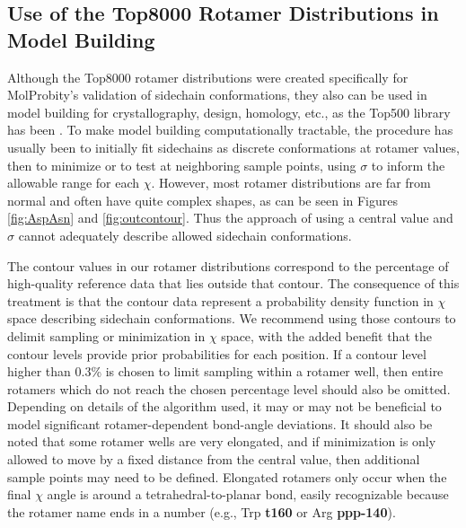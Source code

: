 \subsection{Use of the Top8000 Rotamer Distributions in Model Building}
Although the Top8000 rotamer distributions were created specifically for MolProbity's validation of sidechain conformations, they also can be used in model building for crystallography, design, homology, etc., as the Top500 library has been \cite{Arendall2005, Langer2008, Emsley:ba5144, Headd2008, Terwilliger2008, Adams:2010fk, Gainza2013,Porebski2016}. To make model building computationally tractable, \textcolor{changecolor}{the procedure has usually been to} initially fit sidechains as discrete conformations at rotamer values, then to minimize or to test at neighboring sample points, using $\sigma$ to inform the allowable range for each $\chi$. However, most rotamer distributions are far from normal and often have quite complex shapes, as can be seen in Figures \ref{fig:AspAsn} and \ref{fig:outcontour}. Thus the approach of using a central value and $\sigma$ cannot adequately describe allowed sidechain conformations. 

The contour values in our rotamer distributions correspond to the percentage of high-quality reference data that lies outside that contour. The consequence of this treatment is that the contour data represent a probability density function in $\chi$ space describing sidechain conformations. We recommend using those contours to delimit sampling or minimization in $\chi$ space, with the added benefit that the contour levels provide prior probabilities for each position. If a contour level higher than 0.3\% is chosen \textcolor{changecolor}{to limit sampling within a rotamer well}, then entire rotamers which do not reach the chosen percentage level should also be omitted. Depending on details of the algorithm used, it may or may not be beneficial to model significant rotamer-dependent bond-angle deviations. \textcolor{changecolor}{It should also be noted that some rotamer wells are very elongated, and if minimization is only allowed to move by a fixed distance from the central value, then additional sample points may need to be defined.  Elongated rotamers only occur when the final $\chi$ angle is around a tetrahedral-to-planar bond, easily recognizable because the rotamer name ends in a number (e.g., Trp \textbf{t160} or Arg \textbf{ppp-140}).}

